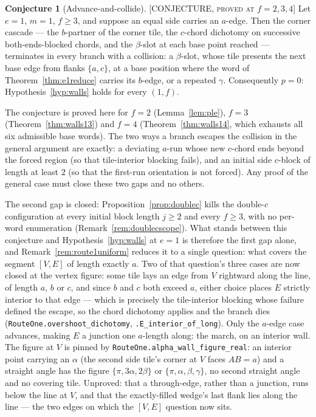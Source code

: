 \documentclass[11pt,reqno]{amsart}
\theoremstyle{plain}
\theoremstyle{definition}
\newtheorem{conjecture}[theorem]{Conjecture}
\newcommand{\lab}[1]{\hfill\textnormal{\footnotesize\textsc{[#1]}}}
\begin{document}
\begin{conjecture}[Advance-and-collide]\label{conj:advance}\lab{CONJECTURE, proved at $f=2,3,4$}
Let $e=1$, $m=1$, $f\ge3$, and suppose an equal side carries an $a$-edge. Then the corner cascade
--- the $b$-partner of the corner tile, the $c$-chord dichotomy on successive both-ends-blocked
chords, and the $\beta$-slot at each base point reached --- terminates in every branch with a
collision: a $\beta$-slot, whose tile presents the next base edge from flanks $\{a,c\}$, at a base
position where the word of Theorem~\ref{thm:e1reduce} carries its $b$-edge, or a repeated $\gamma$.
Consequently $p=0$: Hypothesis~\ref{hyp:walls} holds for every $(1,f)$.

The conjecture is proved here for $f=2$ (Lemma~\ref{lem:ple}), $f=3$ (Theorem~\ref{thm:walls13})
and $f=4$ (Theorem~\ref{thm:walls14}, which exhausts all six admissible base words). The two ways a
branch escapes the collision in the general argument are exactly: a deviating $a$-run whose new
$c$-chord ends beyond the forced region (so that tile-interior blocking fails), and an initial side
$c$-block of length at least $2$ (so that the first-run orientation is not forced). Any proof of the
general case must close these two gaps and no others.

The second gap is closed: Proposition~\ref{prop:doublec} kills the double-$c$ configuration at
every initial block length $j\ge2$ and every $f\ge3$, with no per-word enumeration
(Remark~\ref{rem:doublecscope}). What stands between this conjecture and
Hypothesis~\ref{hyp:walls} at $e=1$ is therefore the first gap alone, and
Remark~\ref{rem:route1uniform} reduces it to a single question: what covers the segment $[V,E]$ of
length exactly $a$. Two of that question's three cases are now closed at the vertex figure: some
tile lays an edge from $V$ rightward along the line, of length $a$, $b$ or $c$, and since $b$ and
$c$ both exceed $a$, either choice places $E$ strictly interior to that edge --- which is precisely
the tile-interior blocking whose failure defined the escape, so the chord dichotomy applies and the
branch dies (\texttt{RouteOne.overshoot\_dichotomy}, \texttt{.E\_interior\_of\_long}). Only the
$a$-edge case advances, making $E$ a junction one $a$-length along: the march, on an interior wall.
The figure at $V$ is pinned by \texttt{RouteOne.alpha\_wall\_figure\_real}: an interior point
carrying an $\alpha$ (the second side tile's corner at $V$ faces $AB=a$) and a straight angle has
the figure $\{\pi,3\alpha,2\beta\}$ or $\{\pi,\alpha,\beta,\gamma\}$, no second straight
angle and no covering tile. Unproved: that a through-edge, rather than a junction, runs below the
line at $V$, and that the exactly-filled wedge's last flank lies along the line --- the two edges on
which the $[V,E]$ question now sits.
\end{conjecture}
\end{document}
